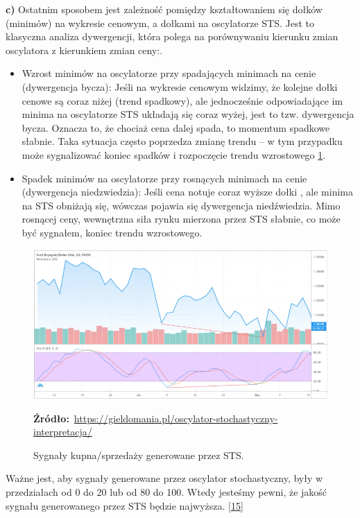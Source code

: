 \documentclass[12pt,a4paper,twoside, inzynierska]{pwr_wmat_praca_dyplomowa}
\theoremstyle{plain}
\numberwithin{theorem}{chapter}
\theoremstyle{definition}
\numberwithin{theorem}{chapter}
\begin{document}
	 	
	\noindent \textbf{c)} 
	Ostatnim sposobem jest zależność pomiędzy kształtowaniem się dołków (minimów) na wykresie cenowym, a dołkami na oscylatorze STS. Jest to klasyczna analiza dywergencji, która polega na porównywaniu kierunku zmian oscylatora z kierunkiem zmian ceny:. 
	\begin{itemize} 
		\item Wzrost minimów na oscylatorze przy spadających minimach na cenie (dywergencja bycza):
		Jeśli na wykresie cenowym widzimy, że kolejne dołki cenowe są coraz niżej (trend spadkowy), ale jednocześnie odpowiadające im minima na oscylatorze STS układają się coraz wyżej, jest to tzw. dywergencja bycza. Oznacza to, że chociaż cena dalej spada, to momentum spadkowe słabnie. Taka sytuacja często poprzedza zmianę trendu – w tym przypadku może sygnalizować koniec spadków i rozpoczęcie trendu wzrostowego  \ref{fig:OSc}.	
		\item  Spadek minimów na oscylatorze przy rosnących minimach na cenie (dywergencja niedzwiedzia):
		Jeśli cena notuje coraz wyższe dołki , ale minima na STS obniżają się, wówczas pojawia się dywergencja niedźwiedzia. Mimo rosnącej ceny, wewnętrzna siła rynku mierzona przez STS słabnie, co może być sygnałem, koniec trendu wzrostowego.
	\end{itemize}
	\vspace{12pt}
	\begin{figure}[H]
		\centering
		\includegraphics[width=1\textwidth]{OSc.png}
		\caption{Sygnały kupna/sprzedaży generowane przez STS.}
		\label{fig:OSc}
		\textbf{Źródło:}\
		\url{https://gieldomania.pl/oscylator-stochastyczny-interpretacja/}
	\end{figure}
	\vspace{12pt}
	 Ważne jest, aby sygnały generowane przez oscylator stochastyczny, były w przedziałach od 0 do 20 lub od 80 do 100. Wtedy jesteśmy pewni, że jakość sygnału generowanego przez STS będzie najwyższa. \hyperref[info15]{[15]}
	 	
\end{document}
